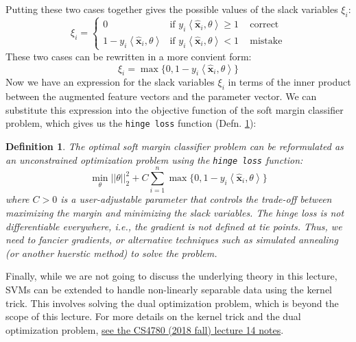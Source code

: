 \documentclass{article}[11pt]
\newtheorem{defn}{Definition}
\newcommand{\norm}[1]{\left|\left|#1\right|\right|}
\begin{document}
Putting these two cases together gives the possible values of the slack variables $\xi_{i}$:
\begin{equation*}
    \xi_{i} = \begin{cases}
        0 & \text{if $y_{i}\left<\hat{\mathbf{x}}_{i},\theta\right> \geq 1$}\,\quad\text{correct}\\
        1 - y_{i}\left<\hat{\mathbf{x}}_{i},\theta\right> & \text{if $y_{i}\left<\hat{\mathbf{x}}_{i},\theta\right> < 1$}\,\quad\text{mistake}
    \end{cases}
\end{equation*}
These two cases can be rewritten in a more convient form:
\begin{equation*}
    \xi_{i} = \max\{0, 1 - y_{i}\left<\hat{\mathbf{x}}_{i},\theta\right>\}
\end{equation*}
Now we have an expression for the slack variables $\xi_{i}$ in terms of the inner product between the augmented feature vectors and the parameter vector.
We can substitute this expression into the objective function of the soft margin classifier problem, which gives us the \texttt{hinge loss} function (Defn. \ref{defn:hinge-loss}):
\begin{mdframed}
\begin{defn}\label{defn:hinge-loss}
The optimal soft margin classifier problem can be reformulated as an unconstrained optimization problem using the \texttt{hinge loss} function:
\begin{equation*}
    \min_{\theta}\norm{\theta}_{2}^{2} + C\sum_{i=1}^{n}\max\{0, 1 - y_{i}\left<\hat{\mathbf{x}}_{i},\theta\right>\}
\end{equation*}
where $C>{0}$ is a user-adjustable parameter that controls the trade-off between maximizing the margin and minimizing the slack variables.
The hinge loss is not differentiable everywhere, i.e., the gradient is not defined at tie points. 
Thus, we need to fancier gradients, or alternative techniques such as simulated annealing (or another huerstic method) to solve the problem. 
\end{defn}
\end{mdframed}

Finally, while we are not going to discuss the underlying theory in this lecture, SVMs can be extended to handle non-linearly separable data using the kernel trick.
This involves solving the dual optimization problem, which is beyond the scope of this lecture.
For more details on the kernel trick and the dual optimization problem, \href{https://www.cs.cornell.edu/courses/cs4780/2018fa/lectures/lecturenote14.html}{see the CS4780 (2018 fall) lecture 14 notes}.
\end{document}
